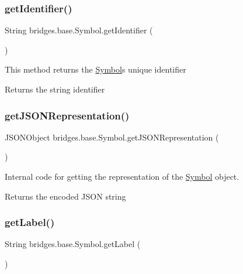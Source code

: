 \subsubsection{\texorpdfstring{get\+Identifier()}{getIdentifier()}}
{\footnotesize\ttfamily String bridges.\+base.\+Symbol.\+get\+Identifier (\begin{DoxyParamCaption}{ }\end{DoxyParamCaption})}

This method returns the \hyperlink{classbridges_1_1base_1_1_symbol}{Symbol}\textquotesingle{}s unique identifier \begin{DoxyReturn}{Returns}
the string identifier 
\end{DoxyReturn}
\mbox{\label{classbridges_1_1base_1_1_symbol_aeba4cfa5b39fe03e72a568a8b7452e60}} 
\subsubsection{\texorpdfstring{get\+J\+S\+O\+N\+Representation()}{getJSONRepresentation()}}
{\footnotesize\ttfamily J\+S\+O\+N\+Object bridges.\+base.\+Symbol.\+get\+J\+S\+O\+N\+Representation (\begin{DoxyParamCaption}{ }\end{DoxyParamCaption})}

Internal code for getting the representation of the \hyperlink{classbridges_1_1base_1_1_symbol}{Symbol} object.

\begin{DoxyReturn}{Returns}
the encoded J\+S\+ON string 
\end{DoxyReturn}
\mbox{\label{classbridges_1_1base_1_1_symbol_a7616c25b288a6e464f4f0b5fe4bd2826}} 
\subsubsection{\texorpdfstring{get\+Label()}{getLabel()}}
{\footnotesize\ttfamily String bridges.\+base.\+Symbol.\+get\+Label (\begin{DoxyParamCaption}{ }\end{DoxyParamCaption})}

